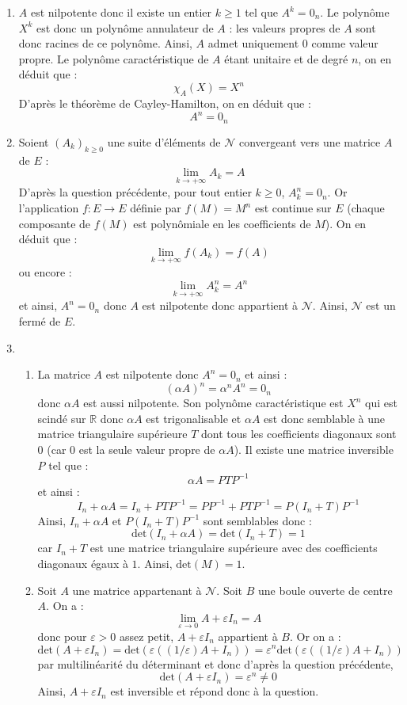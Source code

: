 \documentclass[a4paper,10pt]{report}
\begin{document}
\begin{enumerate}
\item $A$ est nilpotente donc il existe un entier $k \geq 1$ tel que $A^k=0_n$. Le polynôme $X^k$ est donc un polynôme annulateur de $A$ : les valeurs propres de $A$ sont donc racines de ce polynôme. Ainsi, $A$ admet uniquement $0$ comme valeur propre. Le polynôme caractéristique de $A$ étant unitaire et de degré $n$, on en déduit que :
$$ \chi_A(X)=X^n$$
D'après le théorème de Cayley-Hamilton, on en déduit que :
$$ A^n=0_n$$
\item Soient $(A_k)_{k \geq 0}$ une suite d'éléments de $\mathcal{N}$ convergeant vers une matrice $A$ de $E$ :
$$ \lim_{k \rightarrow + \infty} A_k = A$$
D'après la question précédente, pour tout entier $k \geq 0$, $A_k^n=0_n$. Or l'application $f : E \rightarrow E$ définie par $f(M)=M^n$ est continue sur $E$ (chaque composante de $f(M)$ est polynômiale en les coefficients de $M$). On en déduit que :
$$ \lim_{k \rightarrow + \infty} f(A_k) = f(A)$$
ou encore :
$$ \lim_{k \rightarrow + \infty} A_k^n = A^n$$
et ainsi, $A^n=0_n$ donc $A$ est nilpotente donc appartient à $\mathcal{N}$. Ainsi, $\mathcal{N}$ est un fermé de $E$.
\item

\begin{enumerate}
\item La matrice $A$ est nilpotente donc $A^n=0_n$ et ainsi :
$$( \alpha A)^n = \alpha^n A^n = 0_n$$
donc $\alpha A$ est aussi nilpotente. Son polynôme caractéristique est $X^n$ qui est scindé sur $\mathbb{R}$ donc $\alpha A$ est trigonalisable et $\alpha A$ est donc semblable à une matrice triangulaire supérieure $T$ dont tous les coefficients diagonaux sont $0$ (car $0$ est la seule valeur propre de $\alpha A$). Il existe une matrice inversible $P$ tel que :
$$ \alpha A = P TP^{-1}$$
et ainsi :
$$ I_n+ \alpha A = I_n + PTP^{-1} = PP^{-1}+ PTP^{-1} = P(I_n+ T)P^{-1}$$
Ainsi, $I_n+ \alpha A$ et $P(I_n+ T)P^{-1}$ sont semblables donc :
$$ \textrm{det}(I_n+ \alpha A) = \textrm{det}(I_n+ T)=1$$
car $I_n+T$ est une matrice triangulaire supérieure avec des coefficients diagonaux égaux à $1$.
Ainsi, $\textrm{det}(M)=1$.
\item Soit $A$ une matrice appartenant à $\mathcal{N}$. Soit $B$ une boule ouverte de centre $A$. On a :
$$ \lim_{\varepsilon \rightarrow 0} A+ \varepsilon I_n = A$$
donc pour $\varepsilon>0$ assez petit, $A+ \varepsilon I_n$ appartient à $B$. Or on a :
$$ \textrm{det}(A+ \varepsilon I_n) = \textrm{det}(\varepsilon((1/\varepsilon)A+  I_n)) = \varepsilon^n \textrm{det}(\varepsilon((1/\varepsilon)A+  I_n))$$
par multilinéarité du déterminant et donc d'après la question précédente,
$$ \textrm{det}(A+ \varepsilon I_n)  = \varepsilon^n \neq 0$$
Ainsi, $A+ \varepsilon I_n$ est inversible et répond donc à la question.


\end{enumerate}
\end{enumerate}
\end{document}
